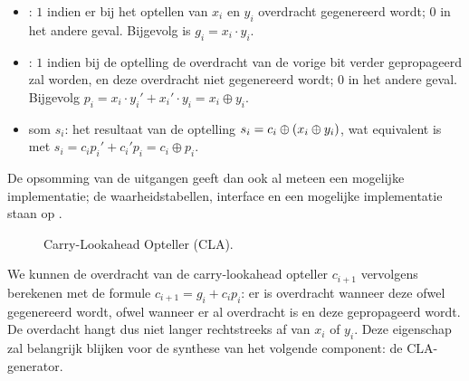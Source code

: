\begin{itemize}
 \item {}: $1$ indien er bij het optellen van $x_i$ en $y_i$ overdracht gegenereerd wordt; $0$ in het andere geval. Bijgevolg is $g_i=x_i\cdot y_i$.
 \item {}: $1$ indien bij de optelling de overdracht van de vorige bit verder gepropageerd zal worden, en deze overdracht niet gegenereerd wordt; $0$ in het andere geval. Bijgevolg $p_i=x_i\cdot y_i'+x_i'\cdot y_i=x_i\oplus y_i$.
 \item som $s_i$: het resultaat van de optelling $s_i=c_i\oplus\left( x_i\oplus y_i \right)$, wat equivalent is met $s_i=c_ip_i'+c_i'p_i=c_i\oplus p_i$.
\end{itemize}

De opsomming van de uitgangen geeft dan ook al meteen een mogelijke implementatie; de waarheidstabellen, interface en een mogelijke implementatie staan op .

\begin{figure}[hbt]
\centering
{}
\caption{Carry-Lookahead Opteller (CLA).}
\end{figure}

We kunnen de overdracht van de carry-lookahead opteller $c_{i+1}$ vervolgens berekenen met de formule $c_{i+1}=g_i+c_ip_i$: er is overdracht wanneer deze ofwel gegenereerd wordt, ofwel wanneer er al overdracht is en deze gepropageerd wordt. De overdacht hangt dus niet langer rechtstreeks af van $x_i$ of $y_i$. Deze eigenschap zal belangrijk blijken voor de synthese van het volgende component: de CLA-generator.

